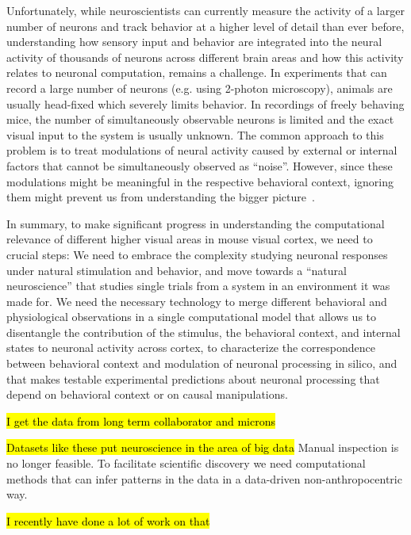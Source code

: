 Unfortunately, while neuroscientists can currently measure the activity of a larger number of neurons and track behavior at a higher level of detail than ever before, understanding how sensory input and behavior are integrated into the neural activity of thousands of neurons across different brain areas and how this activity relates to neuronal computation, remains a challenge.
In experiments that can record a large number of neurons (e.g. using 2-photon microscopy), animals are usually head-fixed which severely limits behavior. 
In recordings of freely behaving mice, the number of simultaneously observable neurons is limited and the exact visual input to the system is usually unknown. 
The common approach to this problem is to treat modulations of neural activity caused by external or internal factors that cannot be simultaneously observed as ``noise''.
However, since these modulations might be meaningful in the respective behavioral context, ignoring them might prevent us from understanding the bigger picture~\parencite{Urai2022-fz}.

In summary, to make significant progress in understanding the computational relevance of different higher visual areas in mouse visual cortex, we need to crucial steps:  We need to embrace the complexity studying neuronal responses under natural stimulation and behavior, and move towards a ``natural neuroscience'' that studies single trials from a system in an environment it was made for.  We need the necessary technology to merge different behavioral and physiological observations in a single computational model that allows us to disentangle the contribution of the stimulus, the behavioral context, and internal states to neuronal activity across cortex, to characterize the correspondence between behavioral context and modulation of neuronal processing in silico, and that makes testable experimental predictions about neuronal processing that depend on behavioral context or on causal manipulations. 

\hl{I get the data from long term collaborator and microns}

\hl{Datasets like these put neuroscience in the area of big data} Manual inspection is no longer feasible. To facilitate scientific discovery we need computational methods that can infer patterns in the data in a data-driven non-anthropocentric way. 

\hl{I recently have done a lot of work on that}

